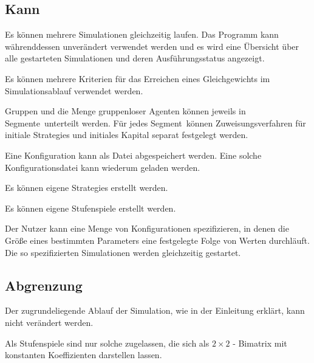 \documentclass[parskip=full,11pt]{scrartcl}
\def\segment{Segment}
\def\segments{Segmente}
\begin{document}
\subsection{Kann}

Es können mehrere Simulationen gleichzeitig laufen. Das Programm kann währenddessen unverändert verwendet werden und es wird eine Übersicht über alle gestarteten Simulationen und deren Ausführungsstatus angezeigt.

Es können mehrere Kriterien für das Erreichen eines Gleichgewichts im Simulationsablauf verwendet werden.

Gruppen und die Menge gruppenloser Agenten können jeweils in \segments\ unterteilt werden. Für jedes \segment\ können Zuweisungsverfahren für initiale \Glspl{Strategie} und initiales Kapital separat festgelegt werden.

Eine Konfiguration kann als Datei abgespeichert werden. Eine solche Konfigurationsdatei kann wiederum geladen werden.

Es können eigene \Glspl{Strategie} erstellt werden.

Es können eigene Stufenspiele erstellt werden.

Der \Gls{Nutzer} kann eine Menge von Konfigurationen spezifizieren, in denen die Größe eines bestimmten Parameters eine festgelegte Folge von Werten durchläuft. Die so spezifizierten Simulationen werden gleichzeitig gestartet.

\subsection{Abgrenzung}

Der zugrundeliegende Ablauf der Simulation, wie in der Einleitung erklärt, kann nicht verändert werden.

Als Stufenspiele sind nur solche zugelassen, die sich als \(2 \times 2\) - Bimatrix mit konstanten Koeffizienten darstellen lassen.
\end{document}
